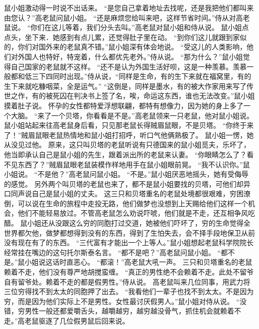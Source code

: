 \documentclass[a4paper,12pt,UTF8,twoside]{ctexbook}
\begin{document}
        鼠小姐激动得一时说不出话来。  
        “是您自己拿着地址去找呢，还是我把他们都叫来由您认？”高老鼠问鼠小姐。  
        “还是麻烦您给叫来吧，这样节省时间。”侍从对高老鼠说。  
        “你们在这儿等着，我们分头去叫。”高老鼠对鼠小姐和侍从说。  
        鼠小姐点点头，坐下来．她感到有点儿累，还觉得肚子里在动。  
        “到你们这儿就跟到家似的，你们对国外来的老鼠真不错。”鼠小姐深有体会地说。  
        “受这儿的人类影响，他们对外国人也特好，特宠着，什么都优先老外。”侍从说。  
        “那为什么？”鼠小姐觉得自己国家的老鼠就不这样。  
        “还不是认为外国生活好呗，这是一种羡慕。羡慕一般都和低三下四同时出现。”侍从说，“同样是生命，有的生下来就在福窝里，有的生下来就吃糠咽菜，全是运气。”        
        “这倒是，同样是墨水，有的被大作家用来写了传世之作，有的被死囚在判决书上签了名，唉，命运这东西，谁也无法改变。”鼠小姐摸着肚子说。  
        怀孕的女性都特爱浮想联翩，都特有想像力，因为她的身上多了一个大脑。  
        “来了一个贝塔，你看看是不是。”高老鼠领来一只老鼠，他对鼠小姐说。  
        鼠小姐站起来往高老鼠身后看，只见那老鼠长得贼眉鼠眼，不是贝塔。  
        “你终于来了！”贼眉鼠眼老鼠热情地和鼠小姐打招呼，听口气他俩熟极了。  
        鼠小姐一愣，她从没见过他。  
        原来，这只叫贝塔的老鼠听说有只德国来的鼠小姐觅夫，乐坏了，他当即承认自己是鼠小姐的先生，跟着派出所的老鼠来认妻。  
        “你眼睛怎么了？看不见东西了？”贼眉鼠眼老鼠装模作样地用手在鼠小姐眼前晃。  
        “我不认识你。”鼠小姐说。  
        “不是他？”高老鼠问鼠小姐。  
        “不是。”鼠小姐厌恶地摇头，她有受侮辱的感觉。  
        另外两个叫贝塔的老鼠也来了，都不是鼠小姐要找的贝塔，可他们却异口同声说自己是鼠小姐的丈夫。  
        这三只和贝塔重名的老鼠处境都很艰难，穷困潦倒，可以说在生命的旅程中走投无路，他们做梦也没想到上天赐给他们这样一个机会，他们不能轻易放过。不管高老鼠怎么劝说吓唬，他们就是不走，还互相争风吃醋。  
        鼠小姐还从没跟这么穷的同胞打过交道，她被他们吓坏了，穷的生命觉得全世界都欠他，做梦都想得到没有的东西，得到了生怕失去，会不择手段地保卫从前没有现在有了的东西。  
        “三代富有才能出一个上等人。”鼠小姐想起老鼠科学院院长经常挂在嘴边的这句托尔斯泰名言。  
        “都不是吧？”高老鼠问鼠小姐。  
        “都不是。”鼠小姐说这话时直恶心。  
        “都滚！”高老鼠大吼一声。  
        三只和贝塔重名的老鼠赖着不走，他们没有尊严地胡搅蛮缠。  
        “真正的男性绝不会赖着不走。此处不留爷自有留爷处。赖着不走的都是假男性。”侍从说。  
        高老鼠叫来几位同事，用武力将三位穷得找不到太太的同胞押了出去。  
        “我看他们一辈子也找不到太太。不是因为穷，而是因为他们实际上不是男性。女性最讨厌假男人。”鼠小姐对侍从说。  
        “没错，穷男性一般还都爱嚼舌头，越嚼越穷，越穷越没骨气，抓住机会就赖着不走。”高老鼠驱逐了几位假男鼠后回来说。  
\end{document}
